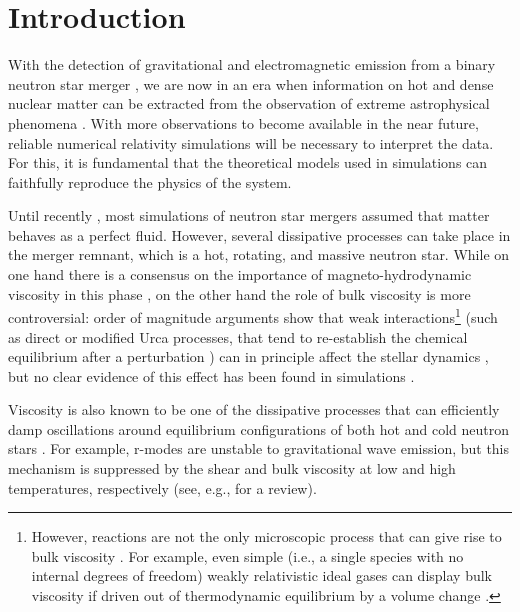 \documentclass[aps,prd,twocolumn,a4paper,floatfix,nofootbib,superscriptaddress,nofootinbib]{revtex4}
\begin{document}
\section{Introduction}
\label{sec:intro}

With the detection of gravitational and electromagnetic emission from a binary
neutron star merger \citep{AbbottNS1,AbbottNS2}, we are now in an era when
information on hot and dense nuclear matter can be extracted from the
observation of extreme astrophysical phenomena \citep{AbbottNS3}. With more
observations to become available in the near future, reliable numerical
relativity simulations will be necessary to interpret the data. For this, it is
fundamental that the theoretical models used in simulations can faithfully
reproduce the physics of the system. 

Until recently \citep[e.g.,][]{Duez04, Radice17, Shibata17, SK17, SK172,
Kiuchi18, RadiceEjecta, Perego19, Vigano20, Radice20, Shibata21}, most
simulations of neutron star mergers assumed that matter behaves as a perfect
fluid. However, several dissipative processes can take place in the merger remnant,
which is a hot, rotating, and massive neutron star.  While on one hand there is
a consensus on the importance of magneto-hydrodynamic viscosity in this phase
\citep{Kiuchi18, Radice17, Shibata17, RadiceEjecta, Vigano20, Radice20,
Shibata21}, on the other hand the role of bulk viscosity is more controversial:
order of magnitude arguments show that weak interactions\footnote{However,
reactions are not the only microscopic process that can give rise to bulk
viscosity \cite{UdeyRadiation1982,Hiscock91,GavassinoRadiazio2020}. For example, even simple (i.e., a single species with no internal
degrees of freedom) weakly relativistic ideal gases can display bulk viscosity if driven out of
thermodynamic equilibrium by a volume change \citep{landau10,
Gavassino21bulk}.} (such as direct \citep{haensel_bulkI} or modified
\citep{haensel_bulkII} Urca processes, that tend to re-establish the chemical
equilibrium after a perturbation \citep[e.g.,][]{Haensel_Bulk_Urca,
haensel_frozen_2002, Gusakov_kantor_2008, Schmitt_review_2018}) can in
principle affect the stellar dynamics \citep{Yakovlev_review_2001, Schmitt_review_2018,
AlfordRezzolla, Most22}, but no clear evidence of this effect has
been found in simulations \citep{Perego19, Most21, Hammond2021, Radice22}.

Viscosity is also known to be one of the dissipative processes that can
efficiently damp oscillations around equilibrium configurations of both hot and
cold neutron stars \citep{cutler1987, Sawyer_Bulk1989, andersson_jones_2000}. For example, r-modes
are unstable to gravitational wave emission, but this mechanism is suppressed
by the shear and bulk viscosity at low and high temperatures, respectively
(see, e.g., \citep{haskell_rmode_review_2015} for a review).
\end{document}
